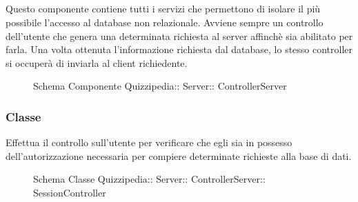 \subsection{}
Questo componente contiene tutti i servizi che permettono di isolare il più possibile l'accesso al database non relazionale. Avviene sempre un controllo dell'utente che genera una determinata richiesta al server affinchè sia abilitato per farla. 
Una volta ottenuta l'informazione richiesta dal database, lo stesso controller si occuperà di inviarla al client richiedente.
\begin{figure}[H]
\centering
\noindent{}
\caption[Schema Componente Quizzipedia::Server::ControllerServer]{Schema Componente Quizzipedia:: Server:: ControllerServer}
\end{figure}
\subsubsection{Classe }
Effettua il controllo sull'utente per verificare che egli sia in possesso dell'autorizzazione necessaria per compiere determinate richieste alla base di dati.
\begin{figure}[H]
\centering
\noindent{}
\caption[Schema Classe SessionController]{Schema Classe Quizzipedia:: Server:: ControllerServer:: SessionController}
\end{figure}
